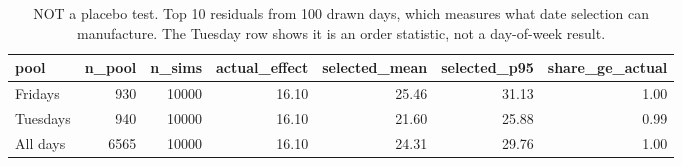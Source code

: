 \begin{table}
\caption{NOT a placebo test. Top 10 residuals from 100 drawn days, which measures what date selection can manufacture. The Tuesday row shows it is an order statistic, not a day-of-week result.}
\begin{tabular}{lrrrrrr}
\toprule
pool & n\_pool & n\_sims & actual\_effect & selected\_mean & selected\_p95 & share\_ge\_actual \\
\midrule
Fridays & 930 & 10000 & 16.10 & 25.46 & 31.13 & 1.00 \\
Tuesdays & 940 & 10000 & 16.10 & 21.60 & 25.88 & 0.99 \\
All days & 6565 & 10000 & 16.10 & 24.31 & 29.76 & 1.00 \\
\bottomrule
\end{tabular}
\end{table}
